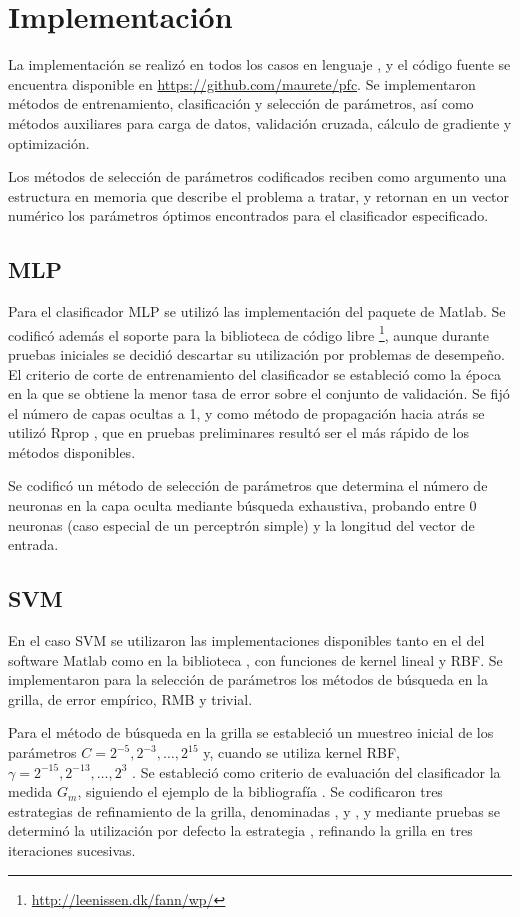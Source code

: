 \documentclass[12pt,bibliography=oldstyle,DIV=12,parskip=half-]{scrreprt}
\begin{document}
\section{Implementación}
%
La implementación se realizó en todos los casos en lenguaje
, y el código fuente se encuentra disponible en
\url{https://github.com/maurete/pfc}. Se implementaron métodos de
entrenamiento, clasificación y selección de parámetros, así como
métodos auxiliares para carga de datos, validación cruzada, cálculo de
gradiente y optimización.

Los métodos de selección de parámetros codificados
reciben como argumento una estructura en memoria que describe el
problema a tratar, y retornan en un vector numérico los parámetros
óptimos encontrados para el clasificador especificado.
%
%
\subsection{MLP}
%
Para el clasificador MLP se utilizó las implementación del paquete
 de Matlab. Se codificó además el soporte
para la biblioteca de código libre
\footnote{\url{http://leenissen.dk/fann/wp/}}, aunque
durante pruebas iniciales se decidió descartar su utilización por
problemas de desempeño.  El criterio de corte de entrenamiento del
clasificador se estableció como la época en la que se obtiene la menor
tasa de error sobre el conjunto de validación.  Se fijó el número de
capas ocultas a 1, y como método de propagación hacia atrás se utilizó
Rprop \cite{rprop}, que en pruebas preliminares resultó ser
el más rápido de los métodos disponibles.

Se codificó un método de selección de parámetros que determina el
número de neuronas en la capa oculta mediante búsqueda exhaustiva,
probando entre 0 neuronas (caso especial de un perceptrón simple) y
la longitud del vector de entrada.
%
%
\subsection{SVM}
%
En el caso SVM se utilizaron las implementaciones disponibles tanto en
el  del software Matlab como en la
biblioteca  \cite{chang}, con funciones de kernel lineal y
RBF.  Se implementaron para la selección de parámetros los métodos de
búsqueda en la grilla, de error empírico, RMB y trivial.

Para el método de búsqueda en la grilla se estableció un muestreo
inicial de los parámetros $C=2^{-5},2^{-3},\ldots,2^{15}$ y, cuando se
utiliza kernel RBF, $\gamma={2^{-15},2^{-13},\ldots,2^3}$ \cite{hsu}.
Se estableció como criterio de evaluación del clasificador la medida
$G_m$, siguiendo el ejemplo de la bibliografía \cite{xue,batuwita}.
Se codificaron tres estrategias de refinamiento de la grilla,
denominadas ,  y , y mediante
pruebas se determinó la utilización por defecto la estrategia
, refinando la grilla en tres iteraciones sucesivas.
\end{document}
